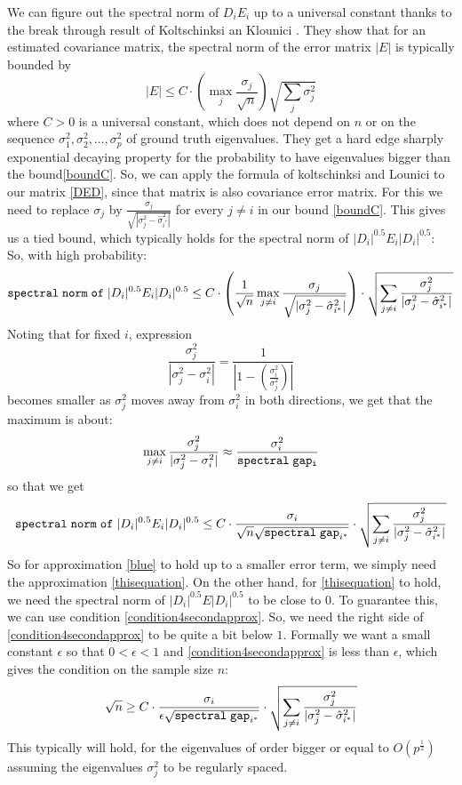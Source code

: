 \documentclass[12pt]{amsart}
\theoremstyle{definition}
\numberwithin{equation}{section}
\numberwithin{equation}{section}
\theoremstyle{remark}
\numberwithin{equation}{section}
\begin{document}
We can figure out the spectral norm of $D_i E_i$ up to a universal constant thanks to the break through result
of Koltschinksi an Klounici \cite{koltchinskii2017normal}. They show that for an estimated covariance matrix, the spectral norm of the error matrix $|E|$ is typically bounded by
\begin{equation}
\label{boundC}
|E|\leq C\cdot \left(\max_{j}\frac{\sigma_j}{\sqrt{n}}\right)\sqrt{\sum_j\sigma_j^2}
\end{equation}
where $C>0$ is a universal constant, which does not depend on $n$ or on the sequence $\sigma_1^2,\sigma_2^2,\ldots,\sigma_p^2$ of ground truth eigenvalues. They get a hard edge sharply exponential decaying property for the probability to have eigenvalues bigger than the bound\ref{boundC}.  So, we can apply the formula of koltschinksi and Lounici to
our matrix \ref{DED}, since that matrix is also covariance error matrix. For this we need to replace $\sigma_j$ by  $\frac{\sigma_j}{\sqrt{|\sigma_j^2-\hat{\sigma}_{i^*}^2|}}$ for every $j\neq i$ in our bound \ref{boundC}. This gives
us a tied bound, which typically holds for the spectral norm of $|D_i|^{0.5}E_i|D_i|^{0.5}$: So, with high probability:
$${\tt spectral\; norm\;of}\;|D_i|^{0.5}E_i|D_i|^{0.5}\leq
C\cdot\left(
\frac{1}{\sqrt{n}}\max_{j\neq i}\frac{\sigma_j}{\sqrt{|\sigma_j^2-\hat{\sigma}_{i^*}^2|}}\right)\cdot
\sqrt{\sum_{j\neq i} \frac{\sigma^2_j}{|\sigma_j^2-\hat{\sigma}_{i^*}^2|}
}$$
Noting that for fixed $i$, expression
$$\frac{\sigma_j^2}{|\sigma_j^2-\sigma_i^2|}=\frac{1}{|1-(\frac{\sigma_i^2}{\sigma_j^2})|}$$
becomes smaller as $\sigma_j^2$ moves away from $\sigma_i^2$ in both directions,
we get that the maximum is about:
$$\max_{j\neq i}\frac{\sigma_j^2}{|\sigma_j^2-\sigma_i^2|}\approx
\frac{\sigma_i^2}{{\tt spectral\;gap_i}}$$
so that we get
\begin{equation}
\label{condition4secondapprox}{\tt spectral\; norm\;of}\;|D_i|^{0.5}E_i|D_i|^{0.5}\leq
C\cdot
\frac{\sigma_i}{\sqrt{n}\sqrt{{\tt spectral \; gap}_{i^*}}}\cdot
\sqrt{\sum_{j\neq i} \frac{\sigma^2_j}{|\sigma_j^2-\hat{\sigma}_{i^*}^2|}
}
\end{equation}
So for approximation \ref{blue} to hold up to a smaller error term, we simply need the approximation \ref{thisequation}. On the other hand, for \ref{thisequation} to hold,
we need the spectral norm of $|D_i|^{0.5}E|D_i|^{0.5}$ to be close to $0$. To guarantee this, we can use condition \ref{condition4secondapprox}. So, we need the right side of \ref{condition4secondapprox} to be quite a bit below $1$. Formally we want a  small constant $\epsilon$ so that $0<\epsilon<1$ and \ref{condition4secondapprox} is less than $\epsilon$, which gives the condition on the sample size $n$:
\begin{equation}
\label{condition_sample_size}\sqrt{n}\geq C\cdot
\frac{\sigma_i}{\epsilon \sqrt{{\tt spectral \; gap}_{i^*}}}\cdot
\sqrt{\sum_{j\neq i} \frac{\sigma^2_j}{|\sigma_j^2-\hat{\sigma}_{i^*}^2|}
}
\end{equation}
This typically will hold, for the eigenvalues of order
bigger or equal to $O(p^{\frac{1}{2}})$ assuming the eigenvalues $\sigma^2_j$ to be regularly spaced.
\end{document}
